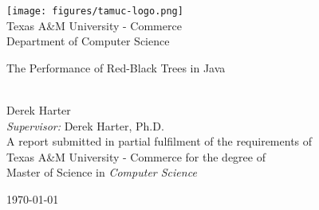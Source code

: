 \documentclass[letterpaper,11pt,oneside]{book}
\begin{document}
    
    \frontmatter
    
    \begin{titlepage}      
        \begin{center}
            \texttt{[image: figures/tamuc-logo.png]}\\[0.5cm]
            {\LARGE Texas A\&M University - Commerce\\[0.5cm]
            Department of Computer Science}\\[2cm]
			
            \linespread{1.2}\huge {
                The Performance of Red-Black Trees in Java
            
            }
            \linespread{1}~\\[2cm]
            {\Large 
                Derek Harter
            }\\[1cm] 
            

            {\large 
                \emph{Supervisor:} Derek Harter, Ph.D.}\\[1cm] %
            
            \large A report submitted in partial fulfilment of the requirements of\\Texas A\&M University - Commerce for the degree of\\ Master of Science in \textit{Computer Science}\\[0.3cm] 
            \vfill
            
            
            \today %
        \end{center}
    \end{titlepage}
    
\end{document}
